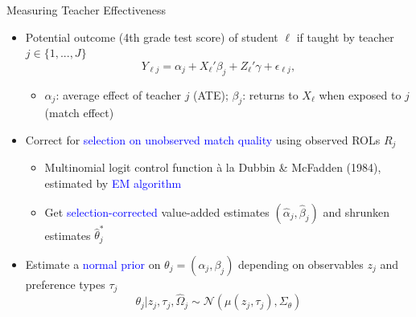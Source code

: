 \documentclass[compress,10pt,aspectratio=169]{beamer}
\newcommand\emphblue[1]{\textcolor{blue}{#1}}
\begin{document}
\begin{frame}{Measuring Teacher Effectiveness}
    \begin{itemize}
        \item Potential outcome (4th grade test score) of student $\ell$ if taught by teacher $j\in\{1,...,J\}$
        $$
        Y_{\ell j}=\alpha_j+X_{\ell}'\beta_j+Z_{\ell}'\gamma+\epsilon_{\ell j},
        $$
        \begin{itemize}
        \item[$\Rightarrow$] $\alpha_j$: average effect of teacher $j$ (ATE); $\beta_j$: returns to $X_{\ell}$ when exposed to $j$ (match effect)
        \end{itemize}
        \medskip
        \item Correct for \emphblue{selection on unobserved match quality} using observed ROLs $R_j$
        \begin{itemize}
        \smallskip
            \item[$\Rightarrow$] Multinomial logit control function à la Dubbin \& McFadden (1984), estimated by \emphblue{EM algorithm}
            \medskip
            \item[$\Rightarrow$] Get \emphblue{selection-corrected} value-added estimates $(\hat{\alpha}_j,\hat{\beta}_j)$ and shrunken estimates $\hat{\theta}_j^*$
        \end{itemize}
        \medskip
        \item Estimate a \emphblue{normal prior} on $\theta_j=(\alpha_j,\beta_j)$ depending on observables $z_j$ and preference types $\tau_j$
        $$
        \theta_j|z_j,\tau_j,\hat{\Omega}_j \sim \mathcal{N}(\mu(z_j,\tau_j),\Sigma_{\theta})
        $$
    \end{itemize}
\end{frame}
\end{document}

